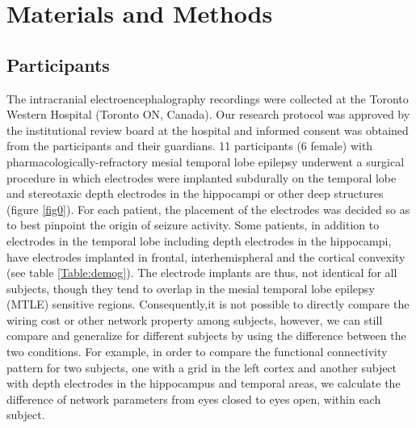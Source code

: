 \documentclass[11pt, onecolumn]{article}
\begin{document}
\section{Materials and Methods}
\label{se:maandme}
\subsection{Participants}

The intracranial electroencephalography recordings were collected at the Toronto Western Hospital (Toronto ON, Canada). Our research protocol was approved by the institutional review board at the hospital and informed consent was obtained from the participants and their guardians. 11 participants (6 female) with pharmacologically-refractory mesial temporal lobe epilepsy underwent a surgical procedure in which electrodes were implanted subdurally on the temporal lobe and stereotaxic depth electrodes in the hippocampi or other deep structures (figure \ref{fig0}).
For each patient, the placement of the electrodes was decided so as to
best pinpoint the origin of seizure activity. Some patients, in addition to electrodes in the temporal lobe including depth electrodes in the hippocampi, have   electrodes implanted in frontal, interhemispheral and the cortical convexity (see table \ref{Table:demog}). The electrode implants are thus, not identical for all subjects, though they tend to overlap in the mesial temporal lobe epilepsy (MTLE) sensitive regions. Consequently,it is not possible to directly compare the wiring cost or other network property among subjects, however, we can still compare and generalize for different subjects by using the difference between the two conditions. For example, in order to compare the functional connectivity pattern for two subjects, one with a grid in the left cortex and another subject with depth electrodes in the hippocampus and temporal areas, we calculate the difference of network parameters from eyes closed to eyes open, within each subject.
\end{document}
